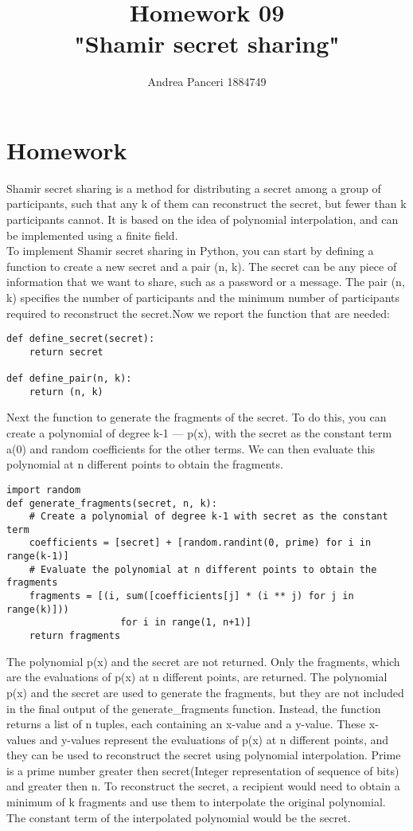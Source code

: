 \documentclass{article}
\title{Homework 09\\"Shamir secret sharing"}
\author{Andrea Panceri 1884749}
\begin{document}
\maketitle

\section{Homework}
Shamir secret sharing is a method for distributing a secret among a group of participants, such that any k of them can reconstruct the secret, but fewer than k participants cannot. It is based on the idea of polynomial interpolation, and can be implemented using a finite field.\\
To implement Shamir secret sharing in Python, you can start by defining a function to create a new secret and a pair (n, k). The secret can be any piece of information that we want to share, such as a password or a message. The pair (n, k) specifies the number of participants and the minimum number of participants required to reconstruct the secret.Now we report the function that are needed:
\begin{lstlisting}
def define_secret(secret):
    return secret

def define_pair(n, k):
    return (n, k)
\end{lstlisting}
Next the function to generate the fragments of the secret. To do this, you can create a polynomial of degree k-1 --- p(x), with the secret as the constant term a(0) and random coefficients for the other terms. We can then evaluate this polynomial at n different points to obtain the fragments.
\begin{lstlisting}
import random
def generate_fragments(secret, n, k):
    # Create a polynomial of degree k-1 with secret as the constant term
    coefficients = [secret] + [random.randint(0, prime) for i in range(k-1)]
    # Evaluate the polynomial at n different points to obtain the fragments
    fragments = [(i, sum([coefficients[j] * (i ** j) for j in range(k)])) 
                    for i in range(1, n+1)]
    return fragments
\end{lstlisting}
The polynomial p(x) and the secret are not returned. Only the fragments, which are the evaluations of p(x) at n different points, are returned. The polynomial p(x) and the secret are used to generate the fragments, but they are not included in the final output of the generate\_fragments function. Instead, the function returns a list of n tuples, each containing an x-value and a y-value. These x-values and y-values represent the evaluations of p(x) at n different points, and they can be used to reconstruct the secret using polynomial interpolation. Prime is a prime number greater then secret(Integer representation of sequence of bits) and greater then n. To reconstruct the secret, a recipient would need to obtain a minimum of k fragments and use them to interpolate the original polynomial. The constant term of the interpolated polynomial would be the secret.\\
\end{document}

